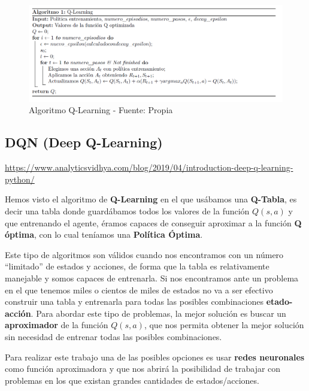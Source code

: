 \documentclass[
  a4paper,
  DIV=11,
  numbers=noendperiod]{scrreprt}
\begin{document}
\begin{figure}

{\centering \includegraphics[width=1\textwidth,height=\textheight]{imagenes/reinforcement_learning/rl_algoritmo_qlearning.png}

}

\caption{Algoritmo Q-Learning - Fuente: Propia}

\end{figure}

\hypertarget{dqn-deep-q-learning}{%
\subsection{DQN (Deep Q-Learning)}\label{dqn-deep-q-learning}}

\url{https://www.analyticsvidhya.com/blog/2019/04/introduction-deep-q-learning-python/}

Hemos visto el algoritmo de \textbf{Q-Learning} en el que usábamos una
\textbf{Q-Tabla}, es decir una tabla donde guardábamos todos los valores
de la función \(Q(s,a)\) y que entrenando el agente, éramos capaces de
conseguir aproximar a la función \textbf{Q óptima}, con lo cual teníamos
una \textbf{Política Óptima}.

Este tipo de algoritmos son válidos cuando nos encontramos con un número
``limitado'' de estados y acciones, de forma que la tabla es
relativamente manejable y somos capaces de entrenarla. Si nos
encontramos ante un problema en el que tenemos miles o cientos de miles
de estados no va a ser efectivo construir una tabla y entrenarla para
todas las posibles combinaciones \textbf{etado-acción}. Para abordar
este tipo de problemas, la mejor solución es buscar un
\textbf{aproximador} de la función \(Q(s,a)\), que nos permita obtener
la mejor solución sin necesidad de entrenar todas las posibles
combinaciones.

Para realizar este trabajo una de las posibles opciones es usar
\textbf{redes neuronales} como función aproximadora y que nos abrirá la
posibilidad de trabajar con problemas en los que existan grandes
cantidades de estados/acciones.
\end{document}
